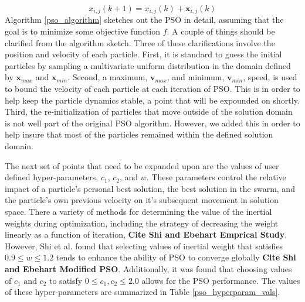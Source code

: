 \begin{equation} \label{pso_pos}
    x_{i,j}(k+1) = x_{i,j}(k) + \mathbf{x}_{i,j}(k)
\end{equation}
Algorithm \ref{pso_algorithm} sketches out the PSO in detail, assuming that the goal is to minimize some objective function $f$. A couple of things should be clarified from the algorithm sketch. Three of these clarifications involve the position and velocity of each particle. First, it is standard to guess the initial particles by sampling a multivariate uniform distribution in the domain defined by $\mathbf{x}_{max}$ and $\mathbf{x}_{min}$. Second, a maximum, $\mathbf{v}_{max}$, and minimum, $\mathbf{v}_{min}$, speed, is used to bound the velocity of each particle at each iteration of PSO. This is in order to help keep the particle dynamics stable, a point that will be expounded on shortly. Third, the re-initialization of particles that move outside of the solution domain is not well part of the original PSO algorithm. However, we added this in order to help insure that most of the particles remained within the defined solution domain.

The next set of points that need to be expanded upon are the values of user defined hyper-parameters, $c_1$, $c_2$, and $w$. These parameters control the relative impact of a particle's personal best solution, the best solution in the swarm, and the particle's own previous velocity on it's subsequent movement in solution space. There a variety of methods for determining the value of the inertial weights during optimization, including the strategy of decreasing the weight linearly as a function of iteration, \textbf{Cite Shi and Ebehart Emprical Study}. However, Shi et al. found that selecting values of inertial weight that satisfies $0.9 \leq w \leq 1.2$ tends to enhance the ability of PSO to converge globally \textbf{Cite Shi and Ebehart Modified PSO}. Additionally, it was found that choosing values of $c_1 \textrm{ and } c_2$ to satisfy $0 \leq c_1, c_2 \leq 2.0$ allows for the PSO performance. The values of these hyper-parameters are summarized in Table \ref{pso_hyperparam_vals}. 

